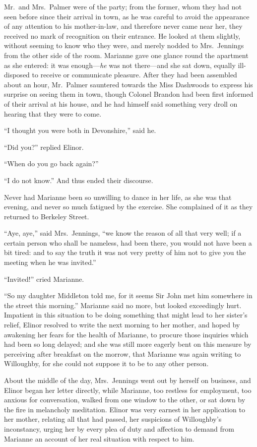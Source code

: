 \documentclass{article}
\begin{document}
Mr.\ and Mrs.\ Palmer were of the party; from the former,
whom they had not seen before since their arrival in town,
as he was careful to avoid the appearance of any attention
to his mother-in-law, and therefore never came near her,
they received no mark of recognition on their entrance.
He looked at them slightly, without seeming to know
who they were, and merely nodded to Mrs.\ Jennings from
the other side of the room.  Marianne gave one glance
round the apartment as she entered: it was enough---\emph{he}
was not there---and she sat down, equally ill-disposed
to receive or communicate pleasure.  After they had been
assembled about an hour, Mr.\ Palmer sauntered towards
the Miss Dashwoods to express his surprise on seeing them
in town, though Colonel Brandon had been first informed
of their arrival at his house, and he had himself said
something very droll on hearing that they were to come.

``I thought you were both in Devonshire,'' said he.

``Did you?'' replied Elinor.

``When do you go back again?''

``I do not know.'' And thus ended their discourse.

Never had Marianne been so unwilling to dance
in her life, as she was that evening, and never so much
fatigued by the exercise.  She complained of it
as they returned to Berkeley Street.

``Aye, aye,'' said Mrs.\ Jennings, ``we know the reason
of all that very well; if a certain person who shall
be nameless, had been there, you would not have been a
bit tired: and to say the truth it was not very pretty
of him not to give you the meeting when he was invited.''

``Invited!'' cried Marianne.

``So my daughter Middleton told me, for it seems Sir
John met him somewhere in the street this morning.''
Marianne said no more, but looked exceedingly hurt.
Impatient in this situation to be doing something
that might lead to her sister's relief, Elinor resolved
to write the next morning to her mother, and hoped
by awakening her fears for the health of Marianne,
to procure those inquiries which had been so long delayed;
and she was still more eagerly bent on this measure
by perceiving after breakfast on the morrow, that Marianne
was again writing to Willoughby, for she could not suppose
it to be to any other person.

About the middle of the day, Mrs.\ Jennings went out by
herself on business, and Elinor began her letter directly,
while Marianne, too restless for employment, too anxious
for conversation, walked from one window to the other,
or sat down by the fire in melancholy meditation.
Elinor was very earnest in her application to her mother,
relating all that had passed, her suspicions of
Willoughby's inconstancy, urging her by every plea
of duty and affection to demand from Marianne an account
of her real situation with respect to him.
\end{document}
